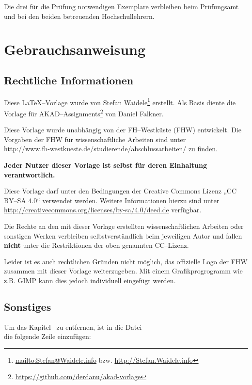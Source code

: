 \documentclass[a4paper,12pt]{article}
\newif\ifichweissdassichfuerdieeinhaltungdervorgabenselbstverantwortlichbin
\begin{document}
Die drei für die Prüfung notwendigen Exemplare verbleiben beim Prüfungsamt und bei
den beiden betreuenden Hochschullehrern.
\fi
\vfill
\vfill
\vfill
\clearpage

\ifichweissdassichfuerdieeinhaltungdervorgabenselbstverantwortlichbin
\else
\section*{Gebrauchsanweisung}
\label{sec:gebrauchsanweisung}
\subsection*{Rechtliche Informationen}
Diese \LaTeX--Vorlage wurde von Stefan Waidele\footnote{\url{mailto:Stefan@Waidele.info} bzw. \url{http://Stefan.Waidele.info}} erstellt. Als Basis diente die Vorlage für AKAD--Assignments\footnote{\url{https://github.com/derdanu/akad-vorlage}} von Daniel Falkner.

Diese Vorlage wurde unabhängig von der FH--Westküste (FHW) entwickelt. Die Vorgaben der FHW für wissenschaftliche Arbeiten sind unter\\ \url{http://www.fh-westkueste.de/studierende/abschlussarbeiten/} zu finden. 

\textbf{Jeder Nutzer dieser Vorlage ist selbst für deren Einhaltung verantwortlich.}

Diese Vorlage darf unter den Bedingungen der Creative Commons Lizenz „CC BY–SA 4.0“ verwendet werden. Weitere Informationen hierzu sind unter \url{http://creativecommons.org/licenses/by-sa/4.0/deed.de} verfügbar.

Die Rechte an den mit dieser Vorlage erstellten wissenschaftlichen Arbeiten oder sonstigen Werken verbleiben selbstverständlich beim jeweiligen Autor und fallen \textbf{nicht} unter die Restriktionen der oben genannten CC–Lizenz.

Leider ist es auch rechtlichen Gründen nicht möglich, das offizielle Logo der FHW zusammen mit dieser Vorlage weiterzugeben. Mit einem Grafikprogrogramm wie z.B. GIMP kann dies jedoch individuell eingefügt werden.

\subsection*{Sonstiges}

Um das Kapitel~ zu entfernen, ist in die Datei \\
 die folgende Zeile einzufügen:


\fi
\end{document}
